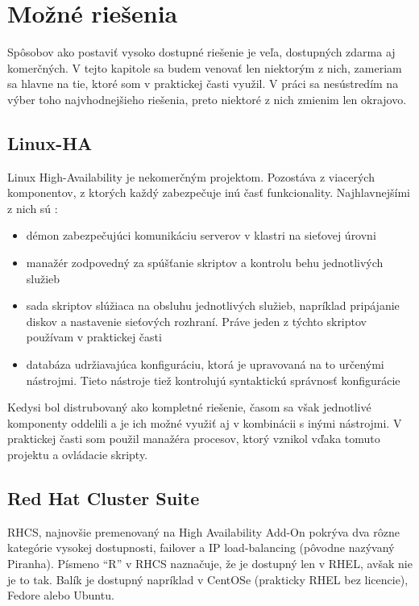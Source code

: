 \chapter{Možné riešenia}
\label{chap:mozne_riesenia}

Spôsobov ako postaviť vysoko dostupné riešenie je veľa, dostupných zdarma aj komerčných. V tejto kapitole sa budem venovať len niektorým z nich, zameriam sa hlavne na tie, ktoré som v praktickej časti využil. V práci sa nesústredím na výber toho najvhodnejšieho riešenia, preto niektoré z nich zmienim len okrajovo.

\section{Linux-HA}
Linux High-Availability je nekomerčným projektom. Pozostáva z viacerých komponentov, z ktorých každý zabezpečuje inú časť funkcionality. Najhlavnejšími z nich sú \cite{pdf:approaches-for-ha}:

\begin{itemize}
	\item démon zabezpečujúci komunikáciu serverov v klastri na sieťovej úrovni
	\item manažér zodpovedný za spúšťanie skriptov a kontrolu behu jednotlivých služieb
	\item sada skriptov slúžiaca na obsluhu jednotlivých služieb, napríklad pripájanie diskov a nastavenie sieťových rozhraní. Práve jeden z týchto skriptov používam v praktickej časti
	\item databáza udržiavajúca konfiguráciu, ktorá je upravovaná na to určenými nástrojmi. Tieto nástroje tiež kontrolujú syntaktickú správnosť konfigurácie
\end{itemize}

Kedysi bol distrubovaný ako kompletné riešenie, časom sa však jednotlivé komponenty oddelili a je ich možné využiť aj v kombinácii s inými nástrojmi. V praktickej časti som použil manažéra procesov, ktorý vznikol vďaka tomuto projektu a ovládacie skripty.

\section{Red Hat Cluster Suite}
RHCS, najnovšie premenovaný na High Availability Add-On pokrýva dva rôzne kategórie vysokej dostupnosti, failover a IP load-balancing (pôvodne nazývaný Piranha). Písmeno "`R"' v RHCS naznačuje, že je dostupný len v RHEL, avšak nie je to tak. Balík je dostupný napríklad v CentOSe (prakticky RHEL bez licencie), Fedore alebo Ubuntu.

